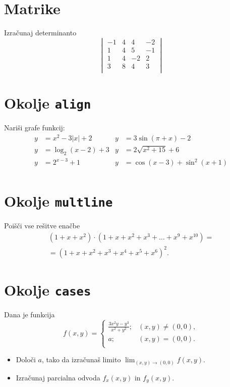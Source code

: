 \documentclass[a4paper,12pt]{article}
\begin{document}
\section*{Matrike}

Izračunaj determinanto
\[\begin{vmatrix}
   -1 & 4 & 4 & -2 \\
   1 & 4 & 5 & -1 \\
   1 & 4 & -2 & 2 \\
   3 & 8 & 4 & 3 \\
\end{vmatrix}\]

\section*{Okolje \texttt{align}}

Nariši grafe funkcij:
\begin{align*}
y &= x^2 - 3|x| + 2   &y &= 3 \sin(\pi+x) - 2 \\
y &= \log_2(x-2) + 3  &y &= 2 \sqrt{x^2+15} + 6 \\
y &= 2^{x-3} + 1      &y &= \cos(x-3) + \sin^2(x+1) \\
\end{align*}

\section*{Okolje \texttt{multline}}

Poišči vse rešitve enačbe
\begin{multline*}
   (1+x+x^2) \cdot (1+x+x^2+x^3+\ldots+x^9+x^{10}) =\\
   =(1+x+x^2+x^3+x^4+x^5+x^6)^2.
\end{multline*}

\section*{Okolje \texttt{cases}}

Dana je funkcija
\[
  f(x,y)=\begin{cases}
      \frac{3x^2y-y^3}{x^2+y^2}; & (x,y)\ne(0,0),\\
      a; & (x,y)=(0,0).\\
   \end{cases} 
\]

\begin{itemize}
\item Določi \(a\), tako da izračunaš limito \( \lim_{(x,y)\to(0,0)} f(x,y) \).
\item Izračunaj parcialna odvoda \(f_x(x,y)\) in \(f_y(x,y)\).
\end{itemize}
\end{document}
